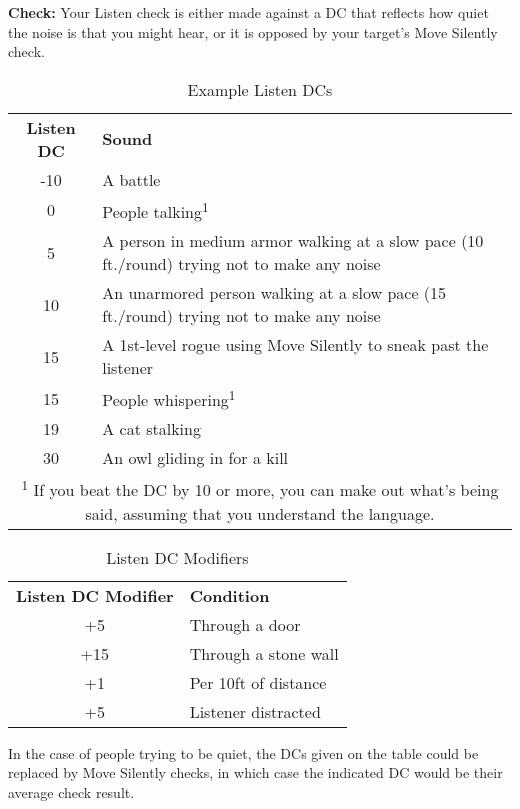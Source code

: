 
\textbf{Check:} Your Listen check is either made against a DC that reflects how 
quiet the noise is that you might hear, or it is opposed by your target's Move 
Silently check.

\begin{table}[htb]
\caption{Example Listen DCs}
\centering
\begin{tabular}{c l}
\textbf{Listen DC} & \textbf{Sound}\\
-10 & A battle\\
0 & People talking\textsuperscript{1}\\
5 & A person in medium armor walking at a slow pace (10 ft./round) trying not to make any noise\\
10 & An unarmored person walking at a slow pace (15 ft./round) trying not to make any noise\\
15 & A 1st-level rogue using Move Silently to sneak past the listener\\
15 & People whispering\textsuperscript{1}\\
19 & A cat stalking\\
30 & An owl gliding in for a kill\\
\multicolumn{2}{p{11cm}}{\textsuperscript{1} If you beat the DC by 10 or more, you can make out what's being said, assuming that you understand the language.}\\
\end{tabular}
\end{table}

\begin{table}[htb]
\caption{Listen DC Modifiers}
\centering
\begin{tabular}{c l}
\textbf{Listen DC Modifier} & \textbf{Condition}\\
+5 & Through a door\\
+15 & Through a stone wall\\
+1 & Per 10ft of distance\\
+5 & Listener distracted\\
\end{tabular}
\end{table}

In the case of people trying to be quiet, the DCs given on the table could be replaced 
by Move Silently checks, in which case the indicated DC would be their average 
check result. 


